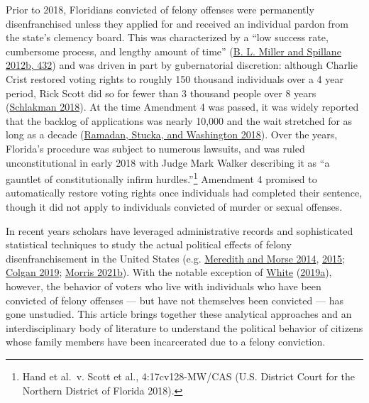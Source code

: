 \documentclass[
  12pt,
]{article}
\begin{document}
Prior to 2018, Floridians convicted of felony offenses were permanently disenfranchised unless they applied for and received an individual pardon from the state's clemency board. This was characterized by a ``low success rate, cumbersome process, and lengthy amount of time'' (\protect\hyperlink{ref-Miller2012a}{B. L. Miller and Spillane 2012b, 432}) and was driven in part by gubernatorial discretion: although Charlie Crist restored voting rights to roughly 150 thousand individuals over a 4 year period, Rick Scott did so for fewer than 3 thousand people over 8 years (\protect\hyperlink{ref-Schlakman2018}{Schlakman 2018}). At the time Amendment 4 was passed, it was widely reported that the backlog of applications was nearly 10,000 and the wait stretched for as long as a decade (\protect\hyperlink{ref-Ramadan2018}{Ramadan, Stucka, and Washington 2018}). Over the years, Florida's procedure was subject to numerous lawsuits, and was ruled unconstitutional in early 2018 with Judge Mark Walker describing it as ``a gauntlet of constitutionally infirm hurdles.''\footnote{Hand et al.~v. Scott et al., 4:17cv128-MW/CAS (U.S. District Court for the Northern District of Florida 2018).} Amendment 4 promised to automatically restore voting rights once individuals had completed their sentence, though it did not apply to individuals convicted of murder or sexual offenses.

In recent years scholars have leveraged administrative records and sophisticated statistical techniques to study the actual political effects of felony disenfranchisement in the United States (e.g. \protect\hyperlink{ref-Meredith2014}{Meredith and Morse 2014}, \protect\hyperlink{ref-Meredith2015}{2015}; \protect\hyperlink{ref-Colgan2019}{Colgan 2019}; \protect\hyperlink{ref-Morris2021}{Morris 2021b}). With the notable exception of \protect\hyperlink{ref-White2019a}{White} (\protect\hyperlink{ref-White2019a}{2019a}), however, the behavior of voters who live with individuals who have been convicted of felony offenses --- but have not themselves been convicted --- has gone unstudied. This article brings together these analytical approaches and an interdisciplinary body of literature to understand the political behavior of citizens whose family members have been incarcerated due to a felony conviction.
\end{document}
